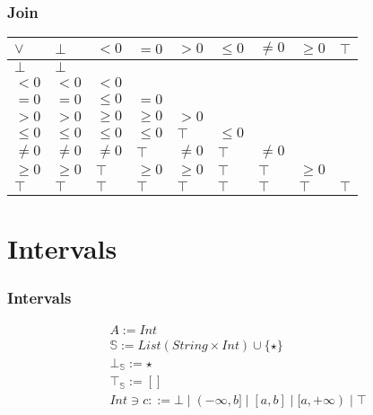 \documentclass{beamer}
\begin{document}
                    \begin{frame}
                        \frametitle{Join}
                        \begin{table}[]
                            \begin{tabular}{|l|l|l|l|l|l|l|l|l|}
                            \hline
                            $\lor$  & $\bot$  & $<0$    & $=0$    & $>0$    & $\le 0$ & $\ne 0$ & $\ge 0$ & $\top$ \\ \hline
                            $\bot$  & $\bot$  &         &         &         &         &         &         &        \\ \hline
                            $<0$    & $<0$    & $<0$    &         &         &         &         &         &        \\ \hline
                            $=0$    & $=0$    & $\le 0$ & $=0$    &         &         &         &         &        \\ \hline
                            $>0$    & $>0$    & $\ge 0$ & $\ge 0$ & $>0$    &         &         &         &        \\ \hline
                            $\le 0$ & $\le 0$ & $\le 0$ & $\le 0$ & $\top$  & $\le 0$ &         &         &        \\ \hline
                            $\ne 0$ & $\ne 0$ & $\ne 0$ & $\top$  & $\ne 0$ & $\top$  & $\ne 0$ &         &        \\ \hline
                            $\ge 0$ & $\ge 0$ & $\top$  & $\ge 0$ & $\ge 0$ & $\top$  & $\top$  & $\ge 0$ &        \\ \hline
                            $\top$  & $\top$  & $\top$  & $\top$  & $\top$  & $\top$  & $\top$  & $\top$  & $\top$ \\ \hline
                            \end{tabular}
                            \end{table}
                    \end{frame}



\section{Intervals}

                    \begin{frame}
                        \frametitle{Intervals}
                        \begin{align*}
                            &A := Int\\
                            &\mathbb{S} := List(String \times Int) \cup \{ \star \} \\
                            &\bot_\mathbb{S} := \star \\
                            &\top_\mathbb{S} := [] \\
                            &Int \ni c ::= \bot \mid (-\infty, b] \mid [a, b] \mid [a, +\infty) \mid \top
                        \end{align*}
                    \end{frame}
                    
\end{document}

